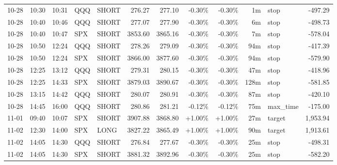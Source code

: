 \documentclass[11pt,a4paper,twoside]{article}
\begin{document}
\begin{center}
\begin{longtable}{>{\color{txtmain}}l l l l l r r r r r >{\color{txtmain}}l r}
10-28 & 10:30 & 10:31 & QQQ & SHORT & 276.27 & 277.10 & \textcolor{lossred}{-0.30\%} & \textcolor{lossred}{-0.30\%} & 1m & stop & \textcolor{lossred}{-497.29} \\
10-28 & 10:40 & 10:46 & QQQ & SHORT & 277.07 & 277.90 & \textcolor{lossred}{-0.30\%} & \textcolor{lossred}{-0.30\%} & 6m & stop & \textcolor{lossred}{-498.73} \\
10-28 & 10:40 & 10:47 & SPX & SHORT & 3853.60 & 3865.16 & \textcolor{lossred}{-0.30\%} & \textcolor{lossred}{-0.30\%} & 7m & stop & \textcolor{lossred}{-578.04} \\
10-28 & 10:50 & 12:24 & QQQ & SHORT & 278.26 & 279.09 & \textcolor{lossred}{-0.30\%} & \textcolor{lossred}{-0.30\%} & 94m & stop & \textcolor{lossred}{-417.39} \\
10-28 & 10:50 & 12:24 & SPX & SHORT & 3866.00 & 3877.60 & \textcolor{lossred}{-0.30\%} & \textcolor{lossred}{-0.30\%} & 94m & stop & \textcolor{lossred}{-579.90} \\
10-28 & 12:25 & 13:12 & QQQ & SHORT & 279.31 & 280.15 & \textcolor{lossred}{-0.30\%} & \textcolor{lossred}{-0.30\%} & 47m & stop & \textcolor{lossred}{-418.96} \\
10-28 & 12:25 & 14:33 & SPX & SHORT & 3879.03 & 3890.67 & \textcolor{lossred}{-0.30\%} & \textcolor{lossred}{-0.30\%} & 128m & stop & \textcolor{lossred}{-581.85} \\
10-28 & 13:15 & 14:42 & QQQ & SHORT & 280.07 & 280.91 & \textcolor{lossred}{-0.30\%} & \textcolor{lossred}{-0.30\%} & 87m & stop & \textcolor{lossred}{-420.10} \\
10-28 & 14:45 & 16:00 & QQQ & SHORT & 280.86 & 281.21 & \textcolor{lossred}{-0.12\%} & \textcolor{lossred}{-0.12\%} & 75m & max\_time & \textcolor{lossred}{-175.00} \\
11-01 & 09:40 & 10:07 & SPX & SHORT & 3907.88 & 3868.80 & \textcolor{wingreen}{+1.00\%} & \textcolor{wingreen}{+1.00\%} & 27m & target & \textcolor{wingreen}{1,953.94} \\
11-02 & 12:30 & 14:00 & SPX & LONG & 3827.22 & 3865.49 & \textcolor{wingreen}{+1.00\%} & \textcolor{wingreen}{+1.00\%} & 90m & target & \textcolor{wingreen}{1,913.61} \\
11-02 & 14:05 & 14:30 & QQQ & SHORT & 276.84 & 277.67 & \textcolor{lossred}{-0.30\%} & \textcolor{lossred}{-0.30\%} & 25m & stop & \textcolor{lossred}{-498.31} \\
11-02 & 14:05 & 14:30 & SPX & SHORT & 3881.32 & 3892.96 & \textcolor{lossred}{-0.30\%} & \textcolor{lossred}{-0.30\%} & 25m & stop & \textcolor{lossred}{-582.20} \\

\end{longtable}
\end{center}
\end{document}
